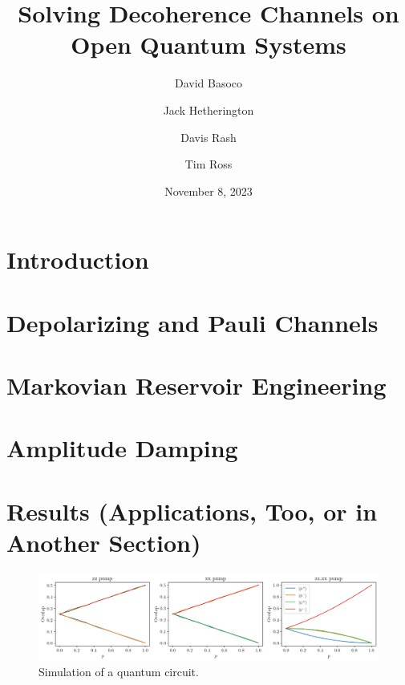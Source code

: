 \documentclass[12pt]{article}
\title{Solving Decoherence Channels on Open Quantum Systems}
\author{David Basoco \and Jack Hetherington \and Davis Rash \and Tim Ross}
\date{November 8, 2023}
\begin{document}
  \maketitle

  \section{Introduction}
  \blindtext

  \section{Depolarizing and Pauli Channels}
  \blindtext

  \section{Markovian Reservoir Engineering}
  \blindtext

  \section{Amplitude Damping}
  \blindtext

  \section{Results (Applications, Too, or in Another Section)}
  \blindtext

  \begin{figure}
    \centering
    \includegraphics[width=\textwidth]{images/reservoir-engineering-simulation}
    \caption{Simulation of a quantum circuit.%
      \label{fig:reservoir-engineering-simulation}}
  \end{figure}

  \printbibliography
\end{document}
